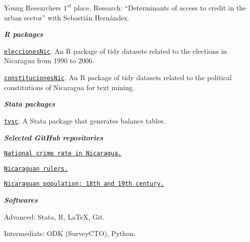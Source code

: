\documentclass[11pt,article,oneside, a4paper]{memoir}
\begin{document}
\ind \hspace{0.35in} \footnotesize Young Researchers $1^{st}$ place. Research: ``Determinants of access to credit in the urban sector'' with Sebastián Hernández. \normalsize \vspace{0.01in}

\bigskip

\noindent\emph{\textbf{R packages} \vspace{0.05in}}

\ind \texttt{\href{https://github.com/RRMaximiliano/eleccionesNic}{eleccionesNic}}. An R package of tidy datasets related to the elections in Nicaragua from 1990 to 2006.

\ind \texttt{\href{https://github.com/RRMaximiliano/constitucionesNic}{constitucionesNic}}. An R package of tidy datasets related to the political constitutions of Nicaragua for text mining.

\medskip
\noindent\emph{\textbf{Stata packages} \vspace{0.05in}}

\ind \texttt{\href{https://github.com/RRMaximiliano/tvsc}{tvsc}}. A Stata package that generates balance tables.

\medskip
\noindent\emph{\textbf{Selected GitHub repositories} \vspace{0.05in}}

\ind \texttt{\href{https://github.com/RRMaximiliano/policia-nacional-nic-stats}{National crime rate in Nicaragua.}}

\ind \texttt{\href{https://github.com/RRMaximiliano/nicaraguan-rulers}{Nicaraguan rulers.}}

\ind \texttt{\href{https://github.com/RRMaximiliano/poblacion-nicaragua-siglo-18-19}{Nicaraguan population: 18th and 19th century.}} 

\bigskip

\noindent\emph{\textbf{Softwares} \vspace{0.05in}}

\ind Advanced: Stata, R, \LaTeX, Git.

\ind Intermediate: ODK (SurveyCTO), Python.
\end{document}
